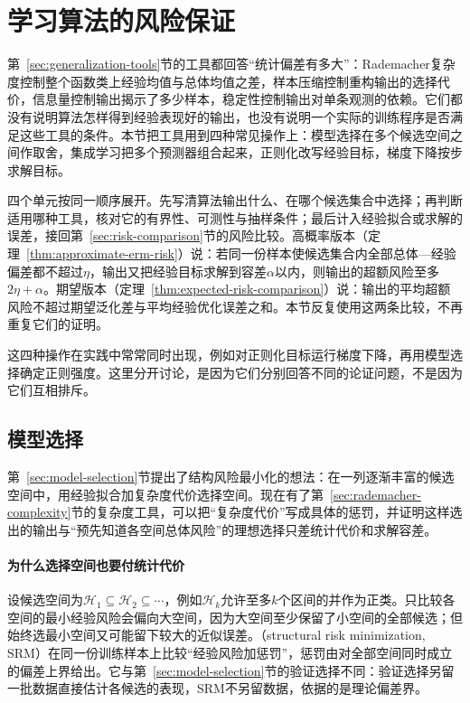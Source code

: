 \section{学习算法的风险保证}
\label{sec:learning-algorithm-guarantees}

第~\ref{sec:generalization-tools}节的工具都回答“统计偏差有多大”：Rademacher复杂度控制整个函数类上经验均值与总体均值之差，样本压缩控制重构输出的选择代价，信息量控制输出揭示了多少样本，稳定性控制输出对单条观测的依赖。它们都没有说明算法怎样得到经验表现好的输出，也没有说明一个实际的训练程序是否满足这些工具的条件。本节把工具用到四种常见操作上：模型选择在多个候选空间之间作取舍，集成学习把多个预测器组合起来，正则化改写经验目标，梯度下降按步求解目标。

四个单元按同一顺序展开。先写清算法输出什么、在哪个候选集合中选择；再判断适用哪种工具，核对它的有界性、可测性与抽样条件；最后计入经验拟合或求解的误差，接回第~\ref{sec:risk-comparison}节的风险比较。高概率版本（定理~\ref{thm:approximate-erm-risk}）说：若同一份样本使候选集合内全部总体—经验偏差都不超过$\eta$，输出又把经验目标求解到容差$\alpha$以内，则输出的超额风险至多$2\eta+\alpha$。期望版本（定理~\ref{thm:expected-risk-comparison}）说：输出的平均超额风险不超过期望泛化差与平均经验优化误差之和。本节反复使用这两条比较，不再重复它们的证明。

这四种操作在实践中常常同时出现，例如对正则化目标运行梯度下降，再用模型选择确定正则强度。这里分开讨论，是因为它们分别回答不同的论证问题，不是因为它们互相排斥。

\subsection{模型选择}
\label{sec:srm}
\label{sec:srm-model-selection}

第~\ref{sec:model-selection}节提出了结构风险最小化的想法：在一列逐渐丰富的候选空间中，用经验拟合加复杂度代价选择空间。现在有了第~\ref{sec:rademacher-complexity}节的复杂度工具，可以把“复杂度代价”写成具体的惩罚，并证明这样选出的输出与“预先知道各空间总体风险”的理想选择只差统计代价和求解容差。

\paragraph{为什么选择空间也要付统计代价}

设候选空间为$\mathcal H_1\subseteq\mathcal H_2\subseteq\cdots$，例如$\mathcal H_k$允许至多$k$个区间的并作为正类。只比较各空间的最小经验风险会偏向大空间，因为大空间至少保留了小空间的全部候选；但始终选最小空间又可能留下较大的近似误差。（structural risk minimization, SRM）在同一份训练样本上比较“经验风险加惩罚”，惩罚由对全部空间同时成立的偏差上界给出。它与第~\ref{sec:model-selection}节的验证选择不同：验证选择另留一批数据直接估计各候选的表现，SRM不另留数据，依据的是理论偏差界。

